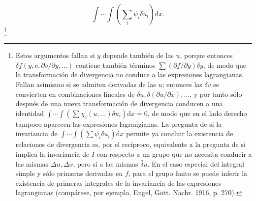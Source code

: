 \documentclass[11pt]{article}
\newcommand{\D}{\Delta}
\providecommand{\dd}{\mathrm d}
\providecommand{\bd}{\bar{\delta}}
\providecommand{\p}{\partial}
\begin{document}
\[
\int\!\cdots\!\int\left(\sum_i\psi_i\delta u_i\right)\dd x.
\]
\footnote{Estos argumentos fallan si \(y\) depende también de las \(u\), porque entonces \(\delta f(y,v,\p v/\p y,\ldots)\) contiene también términos \(\sum(\p f/\p y)\delta y\), de modo que la transformación de divergencia no conduce a las expresiones lagrangianas. Fallan asimismo si se admiten derivadas de las \(u\); entonces las \(\delta v\) se convierten en combinaciones lineales de \(\delta u,\delta(\p u/\p x),\ldots\), y por tanto sólo después de una nueva transformación de divergencia conducen a una identidad \(\int\!\cdots\!\int(\sum\chi_i(u,\ldots)\delta u_i)\dd x=0\), de modo que en el lado derecho tampoco aparecen las expresiones lagrangianas. La pregunta de si la invariancia de \(\int\!\cdots\!\int(\sum\psi_i\delta u_i)\dd x\) permite ya concluir la existencia de relaciones de divergencia es, por el recíproco, equivalente a la pregunta de si implica la invariancia de \(I\) con respecto a un grupo que no necesita conducir a las mismas \(\D u,\D x\), pero sí a las mismas \(\bd u\). En el caso especial del integral simple y sólo primeras derivadas en \(f\), para el grupo finito se puede inferir la existencia de primeras integrales de la invariancia de las expresiones lagrangianas (compárese, por ejemplo, Engel, Gött. Nachr. 1916, p. 270).}
\end{document}
